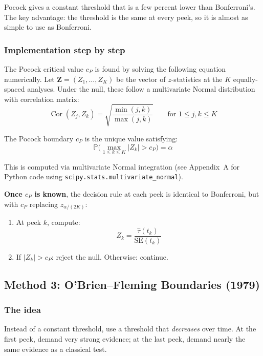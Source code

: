 \documentclass[12pt, a4paper]{article}
\newcommand{\Prob}{\mathbb{P}}
\newcommand{\Cor}{\operatorname{Cor}}
\begin{document}
\begin{plainlanguage}
Pocock gives a constant threshold that is a few percent lower than
Bonferroni's.  The key advantage: the threshold is the same at every peek,
so it is almost as simple to use as Bonferroni.
\end{plainlanguage}

\subsubsection*{Implementation step by step}

The Pocock critical value $c_P$ is found by solving the following equation
numerically.  Let $\mathbf{Z} = (Z_1, \ldots, Z_K)$ be the vector of
$z$-statistics at the $K$ equally-spaced analyses.  Under the null, these
follow a multivariate Normal distribution with correlation matrix:
\[
  \Cor(Z_j, Z_k) = \sqrt{\frac{\min(j,k)}{\max(j,k)}}
  \qquad \text{for } 1 \leq j, k \leq K
\]

The Pocock boundary $c_P$ is the unique value satisfying:
\[
  \Prob\!\bigl(\max_{1 \leq k \leq K} |Z_k| > c_P\bigr) = \alpha
\]

This is computed via multivariate Normal integration (see Appendix~A for
Python code using \texttt{scipy.stats.multivariate\_normal}).

\textbf{Once $c_P$ is known}, the decision rule at each peek is identical
to Bonferroni, but with $c_P$ replacing $z_{\alpha/(2K)}$:

\begin{enumerate}
  \item At peek $k$, compute:
  \[
    Z_k = \frac{\hat{\tau}(t_k)}{\text{SE}(t_k)}
  \]
  \item If $|Z_k| > c_P$: reject the null.  Otherwise: continue.
\end{enumerate}


\subsection{Method 3: O'Brien--Fleming Boundaries (1979)}

\subsubsection*{The idea}

Instead of a constant threshold, use a threshold that \emph{decreases} over
time.  At the first peek, demand very strong evidence; at the last peek,
demand nearly the same evidence as a classical test.
\end{document}
